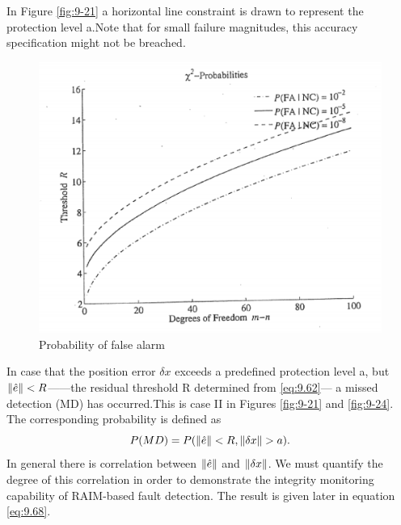 		In Figure \ref{fig:9-21} a horizontal line constraint is drawn to represent the protection level a.Note that for small failure magnitudes, this accuracy specification might not be breached.
		\begin{figure}
			\centering
			\includegraphics[width=0.7\linewidth]{TeX_files/Part03/chapter09/image/9-22}
			\caption{Probability of false alarm}
			\label{fig:9-22}
		\end{figure}
		In case that the position error $\delta x$ exceeds a predefined protection level a, but $\Arrowvert \hat{e} \Arrowvert <R$——the residual threshold R determined from \ref{eq:9.62}— a missed detection (MD) has occurred.This is case II in Figures \ref{fig:9-21} and \ref{fig:9-24}. The corresponding probability is defined as
		\begin{equation}\label{eq:9.63}
			P(MD)=P(\Arrowvert \hat{e} \Arrowvert < R,\Arrowvert \delta x \Arrowvert >a).
		\end{equation}
		In general there is correlation between $\Arrowvert \hat{e} \Arrowvert$ and $\Arrowvert \delta x \Arrowvert$. We must quantify the degree of this correlation in order to  demonstrate the integrity monitoring capability of RAIM-based fault detection. The result is given later in equation \ref{eq:9.68}.
		
